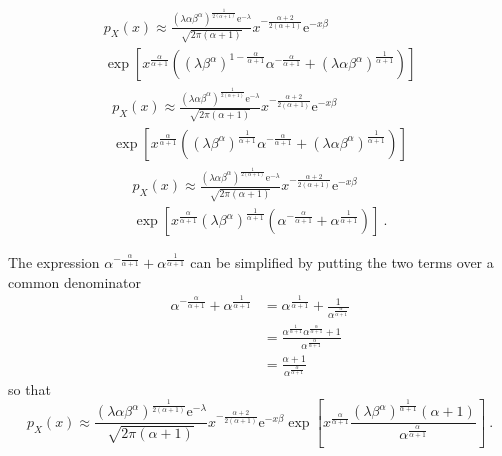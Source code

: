 \documentclass[12pt, a4paper]{memoir}
\newcommand{\euler}{\mathrm{e}}
\begin{document}
\begin{multline*}
	p_X(x)\approx
	\frac{
		\left(
			\lambda\alpha\beta^\alpha
		\right)^{\frac{1}{2(\alpha+1)}}\euler^{-\lambda}
	}
	{
		\sqrt{2\pi(\alpha+1)}}x^{-\frac{\alpha+2}{2(\alpha+1)}
	}
	\euler^{-x\beta}
	\\
	\exp\left[
		x^{\frac{\alpha}{\alpha+1}}
		\left(
			(\lambda\beta^\alpha)^{1-\frac{\alpha}{\alpha+1}}\alpha^{-\frac{\alpha}{\alpha+1}}
			+
			\left(
				\lambda\alpha\beta^\alpha
			\right)^{\frac{1}{\alpha+1}}
		\right)
	\right]
\end{multline*}
\begin{multline*}
	p_X(x)\approx
	\frac{
		\left(\lambda\alpha\beta^\alpha\right)^{\frac{1}{2(\alpha+1)}}\euler^{-\lambda}
	}
	{
		\sqrt{2\pi(\alpha+1)}
	}
	x^{-\frac{\alpha+2}{2(\alpha+1)}}\euler^{-x\beta}
	\\
	\exp\left[
		x^{\frac{\alpha}{\alpha+1}}
		\left(
			(\lambda\beta^\alpha)^{\frac{1}{\alpha+1}}
			\alpha^{-\frac{\alpha}{\alpha+1}}
			+
			\left(\lambda\alpha\beta^\alpha\right)^{\frac{1}{\alpha+1}}
		\right)
	\right]
\end{multline*}
\begin{multline*}
	p_X(x)\approx
	\frac{
		\left(\lambda\alpha\beta^\alpha\right)^{\frac{1}{2(\alpha+1)}}\euler^{-\lambda}
	}
	{
		\sqrt{2\pi(\alpha+1)}
	}
	x^{-\frac{\alpha+2}{2(\alpha+1)}}\euler^{-x\beta}
	\\
	\exp\left[
		x^{\frac{\alpha}{\alpha+1}}(\lambda\beta^\alpha)^{\frac{1}{\alpha+1}}
		\left(
			\alpha^{-\frac{\alpha}{\alpha+1}}+\alpha^{\frac{1}{\alpha+1}}
		\right)
	\right]
	\ .
\end{multline*}

The expression $\alpha^{-\frac{\alpha}{\alpha+1}}+\alpha^{\frac{1}{\alpha+1}}$ can be simplified by putting the two terms over a common denominator
\begin{align}
	\alpha^{-\frac{\alpha}{\alpha+1}}+\alpha^{\frac{1}{\alpha+1}}
	& = \alpha^{\frac{1}{\alpha+1}}+\frac{1}{\alpha^{\frac{\alpha}{\alpha+1}}}
	\nonumber\\
	& = \frac{\alpha^{\frac{1}{\alpha+1}}\alpha^{\frac{\alpha}{\alpha+1}}+1}{\alpha^{\frac{\alpha}{\alpha+1}}}
	\nonumber\\
	& = \frac{\alpha+1}{\alpha^{\frac{\alpha}{\alpha+1}}}
\end{align}
so that
\begin{equation*}
p_X(x)\approx
	\frac{
		\left(\lambda\alpha\beta^\alpha\right)^{\frac{1}{2(\alpha+1)}}\euler^{-\lambda}
	}
	{
		\sqrt{2\pi(\alpha+1)}
	}
	x^{-\frac{\alpha+2}{2(\alpha+1)}}
	\euler^{-x\beta}
	\exp\left[
		x^{\frac{\alpha}{\alpha+1}}
		\frac{(\lambda\beta^\alpha)^{\frac{1}{\alpha+1}}(\alpha+1)}{\alpha^{\frac{\alpha}{\alpha+1}}}
	\right]
	\ .
\end{equation*}
\end{document}
